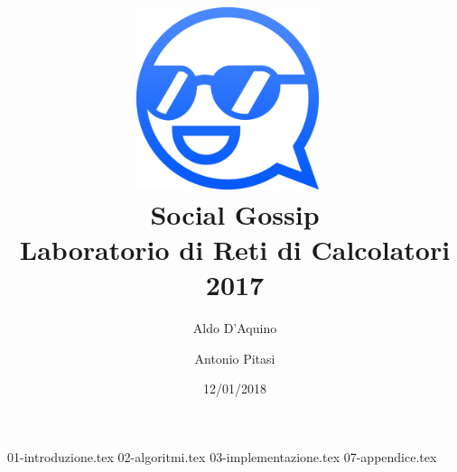 \documentclass{article}
\title{%
\includegraphics[width=0.4\textwidth]{logo.png}~ 
\\[3cm]
\Huge Social Gossip \\
\large Laboratorio di Reti di Calcolatori 2017}
\author{Aldo D'Aquino \and Antonio Pitasi}
\date{12/01/2018}
\begin{document}
\maketitle

\newpage

{01-introduzione.tex}
{02-algoritmi.tex}
{03-implementazione.tex}
{07-appendice.tex}
\end{document}

